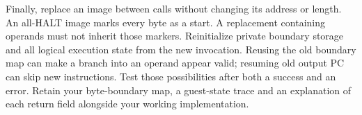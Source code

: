Finally, replace an image between calls without changing its address or length.
An all-HALT image marks every byte as a start. A replacement containing operands
must not inherit those markers. Reinitialize private boundary storage and all
logical execution state from the new invocation. Reusing the old boundary map
can make a branch into an operand appear valid; resuming old output PC can skip
new instructions. Test those possibilities after both a success and an error.
Retain your byte-boundary map, a guest-state trace and an explanation of each
return field alongside your working implementation.
